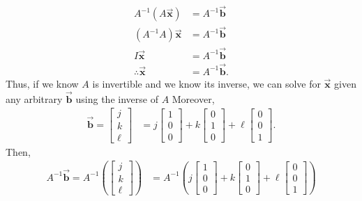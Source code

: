 \documentclass{report}
\begin{document}
\begin{itemize}
        \begin{align*}
            A^{-1}(A\vec{\mathbf{x}})  &= A^{-1}\vec{\mathbf{b}} \\
            (A^{-1}A)\vec{\mathbf{x}} &= A^{-1}\vec{\mathbf{b}} \\
            I\vec{\mathbf{x}} &= A^{-1}\vec{\mathbf{b}} \\
            \therefore \vec{\mathbf{x}} &= A^{-1}\vec{\mathbf{b}}
        .\end{align*}
        \bigbreak \noindent 
        Thus, if we know $A$ is invertible and we know its inverse, we can solve for $\vec{\mathbf{x}}$ given any arbitrary $\vec{\mathbf{b}}$ using the inverse of $A$
        \bigbreak \noindent 
        Moreover, 
        \begin{align*}
            \vec{\mathbf{b}} = \begin{bmatrix} j \\ k \\ \ell \end{bmatrix} &= j\begin{bmatrix} 1 \\ 0 \\ 0 \end{bmatrix} + k \begin{bmatrix} 0 \\ 1 \\ 0 \end{bmatrix} + \ell \begin{bmatrix} 0 \\ 0 \\ 1\end{bmatrix} 
        .\end{align*}
        Then, 
        \begin{align*}
            A^{-1}\vec{\mathbf{b}} = A^{-1}\left( \begin{bmatrix} j \\ k \\ \ell \end{bmatrix}\right) &= A^{-1}\left(j\begin{bmatrix} 1 \\ 0 \\ 0 \end{bmatrix} + k \begin{bmatrix} 0 \\ 1 \\ 0 \end{bmatrix} + \ell \begin{bmatrix} 0 \\ 0 \\ 1\end{bmatrix} \right)

\end{align*}
\end{itemize}
\end{document}
